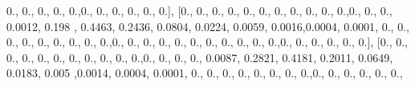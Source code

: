 \documentclass[
]{book}
\newenvironment{Shaded}{\begin{snugshade}}{\end{snugshade}}
\newcommand{\FloatTok}[1]{\textcolor[rgb]{0.00,0.00,0.81}{#1}}
\newcommand{\NormalTok}[1]{#1}
\begin{document}
\begin{Shaded}
\begin{Highlighting}[]
\FloatTok{0.}\NormalTok{, }\FloatTok{0.}\NormalTok{, }\FloatTok{0.}\NormalTok{, }\FloatTok{0.}\NormalTok{, }\FloatTok{0.}\NormalTok{,}\FloatTok{0.}\NormalTok{, }\FloatTok{0.}\NormalTok{, }\FloatTok{0.}\NormalTok{, }\FloatTok{0.}\NormalTok{, }\FloatTok{0.}\NormalTok{, }\FloatTok{0.}\NormalTok{], [}\FloatTok{0.}\NormalTok{, }\FloatTok{0.}\NormalTok{, }\FloatTok{0.}\NormalTok{, }\FloatTok{0.}\NormalTok{, }\FloatTok{0.}\NormalTok{, }\FloatTok{0.}\NormalTok{, }\FloatTok{0.}\NormalTok{, }\FloatTok{0.}\NormalTok{, }\FloatTok{0.}\NormalTok{,}
\FloatTok{0.}\NormalTok{, }\FloatTok{0.}\NormalTok{,}\FloatTok{0.}\NormalTok{, }\FloatTok{0.}\NormalTok{, }\FloatTok{0.}\NormalTok{, }\FloatTok{0.0012}\NormalTok{, }\FloatTok{0.198}\NormalTok{ , }\FloatTok{0.4463}\NormalTok{, }\FloatTok{0.2436}\NormalTok{, }\FloatTok{0.0804}\NormalTok{, }\FloatTok{0.0224}\NormalTok{, }\FloatTok{0.0059}\NormalTok{,}
\FloatTok{0.0016}\NormalTok{,}\FloatTok{0.0004}\NormalTok{, }\FloatTok{0.0001}\NormalTok{, }\FloatTok{0.}\NormalTok{, }\FloatTok{0.}\NormalTok{, }\FloatTok{0.}\NormalTok{, }\FloatTok{0.}\NormalTok{, }\FloatTok{0.}\NormalTok{, }\FloatTok{0.}\NormalTok{, }\FloatTok{0.}\NormalTok{, }\FloatTok{0.}\NormalTok{, }\FloatTok{0.}\NormalTok{,}\FloatTok{0.}\NormalTok{, }\FloatTok{0.}\NormalTok{, }\FloatTok{0.}\NormalTok{, }\FloatTok{0.}\NormalTok{, }\FloatTok{0.}\NormalTok{,}
\FloatTok{0.}\NormalTok{, }\FloatTok{0.}\NormalTok{, }\FloatTok{0.}\NormalTok{, }\FloatTok{0.}\NormalTok{, }\FloatTok{0.}\NormalTok{, }\FloatTok{0.}\NormalTok{,}\FloatTok{0.}\NormalTok{, }\FloatTok{0.}\NormalTok{, }\FloatTok{0.}\NormalTok{, }\FloatTok{0.}\NormalTok{, }\FloatTok{0.}\NormalTok{, }\FloatTok{0.}\NormalTok{], [}\FloatTok{0.}\NormalTok{, }\FloatTok{0.}\NormalTok{, }\FloatTok{0.}\NormalTok{, }\FloatTok{0.}\NormalTok{, }\FloatTok{0.}\NormalTok{, }\FloatTok{0.}\NormalTok{, }\FloatTok{0.}\NormalTok{, }\FloatTok{0.}\NormalTok{,}
\FloatTok{0.}\NormalTok{, }\FloatTok{0.}\NormalTok{, }\FloatTok{0.}\NormalTok{,}\FloatTok{0.}\NormalTok{, }\FloatTok{0.}\NormalTok{, }\FloatTok{0.}\NormalTok{, }\FloatTok{0.}\NormalTok{, }\FloatTok{0.0087}\NormalTok{, }\FloatTok{0.2821}\NormalTok{, }\FloatTok{0.4181}\NormalTok{, }\FloatTok{0.2011}\NormalTok{, }\FloatTok{0.0649}\NormalTok{, }\FloatTok{0.0183}\NormalTok{, }\FloatTok{0.005}
\NormalTok{,}\FloatTok{0.0014}\NormalTok{, }\FloatTok{0.0004}\NormalTok{, }\FloatTok{0.0001}\NormalTok{, }\FloatTok{0.}\NormalTok{, }\FloatTok{0.}\NormalTok{, }\FloatTok{0.}\NormalTok{, }\FloatTok{0.}\NormalTok{, }\FloatTok{0.}\NormalTok{, }\FloatTok{0.}\NormalTok{, }\FloatTok{0.}\NormalTok{, }\FloatTok{0.}\NormalTok{,}\FloatTok{0.}\NormalTok{, }\FloatTok{0.}\NormalTok{, }\FloatTok{0.}\NormalTok{, }\FloatTok{0.}\NormalTok{, }\FloatTok{0.}\NormalTok{, }\FloatTok{0.}\NormalTok{,}

\end{Highlighting}
\end{Shaded}
\end{document}

